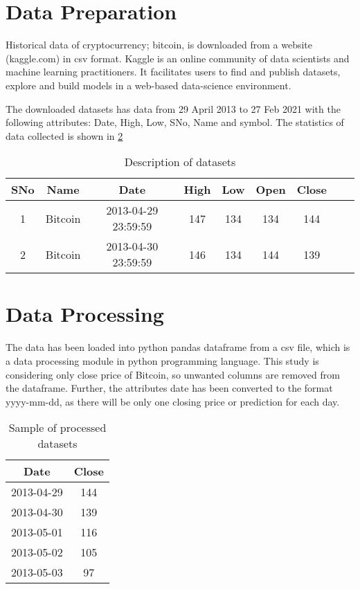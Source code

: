 \section{Data Preparation}
Historical data of cryptocurrency; bitcoin, is downloaded from a website (kaggle.com) in csv format. Kaggle is an online community of data scientists and machine learning practitioners. It facilitates users to find and publish datasets, explore and build models in a web-based data-science environment. 

The downloaded datasets has data from 29 April 2013 to 27 Feb 2021 with the following attributes: Date, High, Low, SNo, Name and symbol. The statistics of data collected is shown in \ref{table:1}

\begin{table}[ht]
	\captionsetup{justification=centering}
	\caption{Description of datasets}
	\centering
	\begin{tabular}{ c  c  c  c  c  c  c  c  c }
		\hline\hline
		SNo & Name & Date &  High & Low & Open & Close \\ 
		\hline
		 1 & Bitcoin & 2013-04-29 23:59:59 &  147 &  134 & 134 & 144 \\
		 2 & Bitcoin & 2013-04-30 23:59:59 &  146 &  134 & 144 & 139 \\
		\hline
	\end{tabular} 
\label{table:1}
\end{table}

\section{Data Processing}
The data has been loaded into python pandas dataframe from a csv file, which is a data processing module in python programming language. This study is considering only close price of Bitcoin, so unwanted columns are removed from the dataframe. Further, the attributes date has been converted to the format yyyy-mm-dd, as there will be only one closing price or prediction for each day. 

\begin{table}[h]
	\captionsetup{justification=centering}
	\caption{Sample of processed datasets}
	\centering
	\begin{tabular}{ c  c  }
		\hline\hline
		Date &  Close \\ 
		\hline
		2013-04-29 & 144\\
		2013-04-30 & 139 \\
		2013-05-01 & 116 \\
		2013-05-02 & 105 \\
		2013-05-03 & 97 \\
		\hline
	\end{tabular} 
	\label{table:1}
\end{table}

